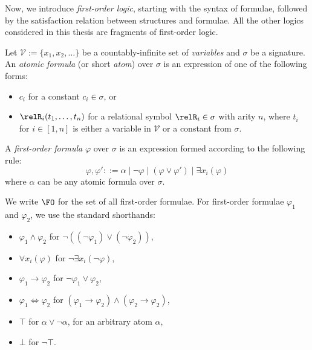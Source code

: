 Now, we introduce \emph{first-order logic}, starting with the syntax of formulae, followed by the satisfaction relation between structures and formulae.
All the other logics considered in this thesis are fragments of first-order logic.
\begin{definition}
  Let $\mathcal{V} := \{x_{1}, x_{2}, \ldots\}$ be a countably-infinite set of \emph{variables} and $\sigma$ be a signature.
  An \emph{atomic formula} (or short \emph{atom}) over $\sigma$ is an expression of one of the following forms:
  \begin{itemize}
    \item $c_{i}$ for a constant $c_{i} \in \sigma$, or
    \item $\relR_{i}(t_{1}, \ldots, t_{n})$ for a relational symbol $\relR_{i} \in \sigma$ with arity $n$, where $t_{i}$ for $i \in [1,n]$ is either a variable in $\mathcal{V}$ or a constant from $\sigma$.
  \end{itemize}
  A \emph{first-order formula} $\varphi$ over $\sigma$ is an expression formed according to the following rule:
  \begin{equation*}
    \varphi, \varphi' ::= \alpha
      \mid \neg \varphi
      \mid (\varphi \lor \varphi')
      \mid \exists{x_{i}}(\varphi)
  \end{equation*}
  where $\alpha$ can be any atomic formula over $\sigma$.
\end{definition}
We write $\FO$ for the set of all first-order formulae.
For first-order formulae $\varphi_{1}$ and $\varphi_{2}$, we use the standard shorthands:
\begin{multicols}{2}
  \begin{itemize}
    \item $\varphi_{1} \land \varphi_{2}$ for $\neg ((\neg \varphi_{1}) \lor (\neg \varphi_{2}))$,
    \item $\forall{x_{i}}(\varphi)$ for $\neg\exists{x_{i}}(\neg \varphi)$,
    \item $\varphi_{1} \to \varphi_{2}$ for $\neg \varphi_{1} \lor \varphi_{2}$,
    \item $\varphi_{1} \iff \varphi_{2}$ for $(\varphi_{1} \to \varphi_{2}) \land (\varphi_{2} \to \varphi_{2})$,
    \item $\top$ for $\alpha \lor \neg \alpha$, for an arbitrary atom $\alpha$,
    \item $\bot$ for $\neg \top$.
  \end{itemize}
\end{multicols}
